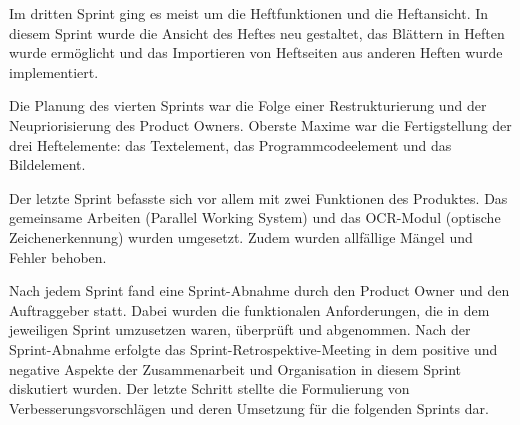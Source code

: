 
Im dritten Sprint ging es meist um die Heftfunktionen und die Heftansicht. In diesem Sprint wurde die Ansicht des Heftes neu gestaltet, das Blättern in Heften wurde ermöglicht und das Importieren von Heftseiten aus anderen Heften wurde implementiert.


\newpage

Die Planung des vierten Sprints war die Folge einer Restrukturierung und der Neupriorisierung des Product Owners. Oberste Maxime war die Fertigstellung der drei Heftelemente: das Textelement, das Programmcodeelement und das Bildelement.


Der letzte Sprint befasste sich vor allem mit zwei Funktionen des Produktes. Das gemeinsame Arbeiten (Parallel Working System) und das OCR-Modul (optische Zeichenerkennung) wurden umgesetzt. Zudem wurden allfällige Mängel und Fehler behoben.


Nach jedem Sprint fand eine Sprint-Abnahme durch den Product Owner und den Auftraggeber statt. Dabei wurden die funktionalen Anforderungen, die in dem jeweiligen Sprint umzusetzen waren, überprüft und abgenommen. Nach der Sprint-Abnahme erfolgte das Sprint-Retrospektive-Meeting in dem positive und negative Aspekte der Zusammenarbeit und Organisation in diesem Sprint diskutiert wurden. Der letzte Schritt stellte die Formulierung von Verbesserungsvorschlägen und deren Umsetzung für die folgenden Sprints dar.


